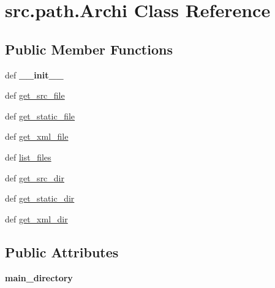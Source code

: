 \hypertarget{classsrc_1_1path_1_1_archi}{\section{src.\-path.\-Archi \-Class \-Reference}
\label{classsrc_1_1path_1_1_archi}
}
\subsection*{\-Public \-Member \-Functions}
\begin{DoxyCompactItemize}
\item 
\hypertarget{classsrc_1_1path_1_1_archi_a5e49ce2f6ec906ae9f1c60f089abdefe}{def {\bfseries \-\_\-\-\_\-init\-\_\-\-\_\-}}\label{classsrc_1_1path_1_1_archi_a5e49ce2f6ec906ae9f1c60f089abdefe}

\item 
def \hyperlink{classsrc_1_1path_1_1_archi_af6b12107c838258948e94261928d1b69}{get\-\_\-src\-\_\-file}
\item 
def \hyperlink{classsrc_1_1path_1_1_archi_a9bb82f507e0be6c0b510233c1c44fab6}{get\-\_\-static\-\_\-file}
\item 
def \hyperlink{classsrc_1_1path_1_1_archi_addb072a0b24a07ed2dc671574ee1aafb}{get\-\_\-xml\-\_\-file}
\item 
def \hyperlink{classsrc_1_1path_1_1_archi_a991f23088efcdf51f48a66ec88540cfc}{list\-\_\-files}
\item 
def \hyperlink{classsrc_1_1path_1_1_archi_ada62e7305d4cb4535b88470fa2c96706}{get\-\_\-src\-\_\-dir}
\item 
def \hyperlink{classsrc_1_1path_1_1_archi_a82947d08ce2cc4391b74b18856f8f8b9}{get\-\_\-static\-\_\-dir}
\item 
def \hyperlink{classsrc_1_1path_1_1_archi_a660251a0c89df993aa3bbb7125d48359}{get\-\_\-xml\-\_\-dir}
\end{DoxyCompactItemize}
\subsection*{\-Public \-Attributes}
\begin{DoxyCompactItemize}
\item 
\hypertarget{classsrc_1_1path_1_1_archi_a36476c40b1b0b330a26f1b74ca455862}{{\bfseries main\-\_\-directory}}\label{classsrc_1_1path_1_1_archi_a36476c40b1b0b330a26f1b74ca455862}

\end{DoxyCompactItemize}


